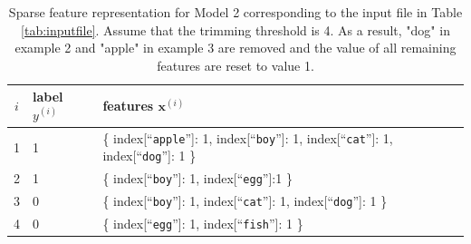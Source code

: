 \documentclass[11pt]{article}
\numberwithin{equation}{section} %
\numberwithin{figure}{section} %
\numberwithin{table}{section} %
\newcommand{\xv}{\mathbf{x}}
\begin{document}
\begin{table}[p]
    \centering
%
\begin{tabular}{cll}
\toprule
$i$ & {\bf label} $y^{(i)}$ & {\bf features} $\xv^{(i)}$ \\
\midrule
1 & 1 &  \{ index[``{\tt apple}'']: 1, index[``{\tt boy}'']: 1, index[``{\tt cat}'']: 1, index[``{\tt dog}'']: 1 \} \\
2 & 1 & \{ index[``{\tt boy}'']: 1,  index[``{\tt egg}'']:1 \} \\
3 & 0 & \{  index[``{\tt boy}'']: 1, index[``{\tt cat}'']: 1, index[``{\tt dog}'']: 1 \} \\
4 & 0 & \{ index[``{\tt egg}'']: 1, index[``{\tt fish}'']: 1 \} \\
\bottomrule
\end{tabular}
%
    \caption{Sparse feature representation for Model 2 corresponding to the input file in Table \ref{tab:inputfile}. Assume that the trimming threshold is 4. As a result, "dog" in example 2 and "apple" in example 3 are removed and the value of all remaining features are reset to value 1.}
    \label{tab:model2sparse}
\end{table}


%
%
\end{document}
